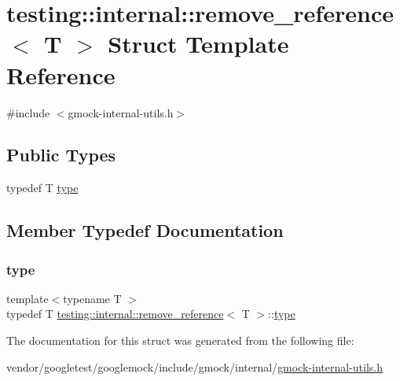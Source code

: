 \hypertarget{structtesting_1_1internal_1_1remove__reference}{}\section{testing\+:\+:internal\+:\+:remove\+\_\+reference$<$ T $>$ Struct Template Reference}
\label{structtesting_1_1internal_1_1remove__reference}


{\ttfamily \#include $<$gmock-\/internal-\/utils.\+h$>$}

\subsection*{Public Types}
\begin{DoxyCompactItemize}
\item 
typedef T \hyperlink{structtesting_1_1internal_1_1remove__reference_a291edca52c59a0d211977d4802439b8a}{type}
\end{DoxyCompactItemize}


\subsection{Member Typedef Documentation}
\mbox{\label{structtesting_1_1internal_1_1remove__reference_a291edca52c59a0d211977d4802439b8a}} 
\subsubsection{\texorpdfstring{type}{type}}
{\footnotesize\ttfamily template$<$typename T $>$ \\
typedef T \hyperlink{structtesting_1_1internal_1_1remove__reference}{testing\+::internal\+::remove\+\_\+reference}$<$ T $>$\+::\hyperlink{structtesting_1_1internal_1_1remove__reference_a291edca52c59a0d211977d4802439b8a}{type}}



The documentation for this struct was generated from the following file\+:\begin{DoxyCompactItemize}
\item 
vendor/googletest/googlemock/include/gmock/internal/\hyperlink{gmock-internal-utils_8h}{gmock-\/internal-\/utils.\+h}\end{DoxyCompactItemize}
